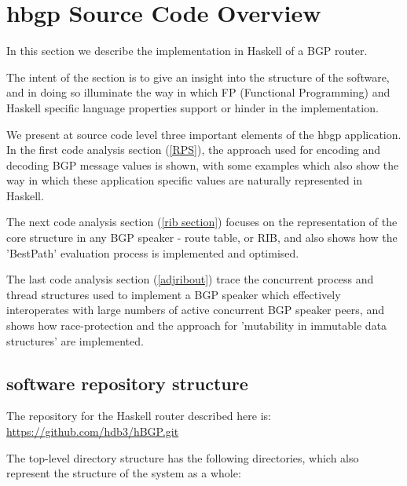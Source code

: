 \section{hbgp Source Code Overview}

In this section we describe the implementation in Haskell of a BGP router.

The intent of the section is to give an insight into the structure of the software, and in doing so illuminate the way in which FP (Functional Programming) and  Haskell specific language properties support or hinder in the implementation.

\bigskip

We present at source code level three important elements of the hbgp application.  In the first code analysis section (\ref{RPS}), the approach used for encoding and decoding BGP message values is shown, with some examples which also show the way in which these application specific values are naturally represented in Haskell.

The next code analysis section (\ref{rib section}) focuses on the representation of the core structure in any BGP speaker - route table, or RIB, and also shows how the 'BestPath' evaluation process is implemented and optimised.

The last code analysis section (\ref{adjribout}) trace the concurrent process and thread structures used to implement a BGP speaker which effectively interoperates with large numbers of active concurrent BGP speaker peers, and shows how race-protection and the approach  for 'mutability in immutable data structures' are implemented.

\subsection{software repository structure}

The repository for the Haskell router described here is: \url{https://github.com/hdb3/hBGP.git}

The top-level directory structure has the following directories, which also represent the structure of the system as a whole:

